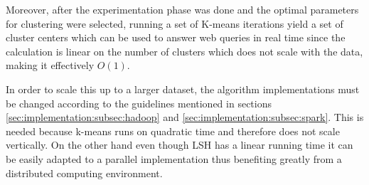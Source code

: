 \documentclass[10pt,a4paper]{scrartcl}
\begin{document}
      Moreover, after the experimentation phase was done and the optimal
      parameters for clustering were selected, running a set of K-means
      iterations yield a set of cluster centers which can be used to answer
      web queries in real time since the calculation is linear on the number
      of clusters which does not scale with the data, making it effectively
      $O(1)$.
      
      In order to scale this up to a larger dataset, the algorithm
      implementations must be changed according to the guidelines mentioned
      in sections \ref{sec:implementation:subsec:hadoop} and
      \ref{sec:implementation:subsec:spark}. This is needed because
      k-means runs on quadratic time and therefore does not scale vertically.
      On the other hand even though LSH has a linear running time
      it can be easily adapted to a parallel implementation
      thus benefiting greatly from a distributed computing environment.
  
  
\end{document}
